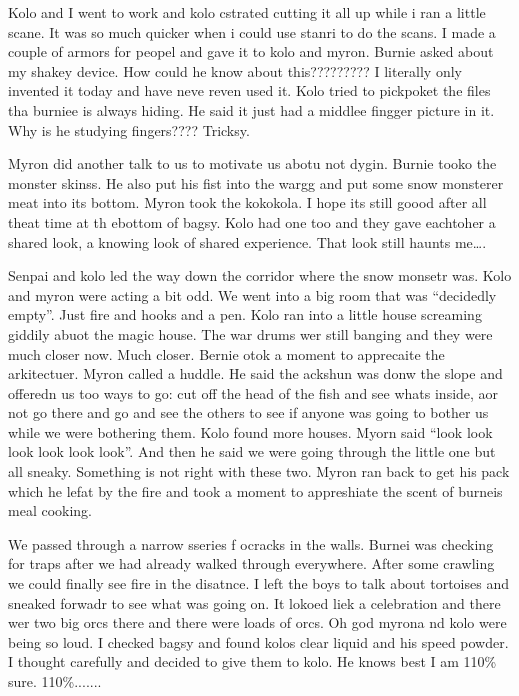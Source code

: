 \begin{multicols}{2}
Kolo and I went to work and kolo cstrated cutting it all up while i ran a little scane. It was so much quicker when i could use stanri to do the scans. I made a couple of armors for peopel and gave it to kolo and myron. Burnie asked about my shakey device. How could he know about this????????? I literally only invented it today and have neve reven used it. Kolo tried to pickpoket the files tha burniee is always hiding. He said it just had a middlee fingger picture in it. Why is he studying fingers???? Tricksy.\medskip

Myron did another talk to us to motivate us abotu not dygin. Burnie tooko the monster skinss. He also put his fist into the wargg and put some snow monsterer meat into its bottom. Myron took the kokokola. I hope its still goood after all theat time at th ebottom of bagsy. Kolo had one too and they gave eachtoher a shared look, a knowing look of shared experience. That look still haunts me….\medskip

Senpai and kolo led the way down the corridor where the snow monsetr was. Kolo and myron were acting a bit odd. We went into a big room that was “decidedly empty”. Just fire and hooks and a pen. Kolo ran into a little house screaming giddily abuot the magic house. The war drums wer still banging and they were much closer now. Much closer. Bernie otok a moment to apprecaite the arkitectuer. Myron called a huddle. He said the ackshun was donw the slope and offeredn us too ways to go: cut off the head of the fish and see whats inside, aor not go there and go and see the others to see if anyone was going to bother us while we were bothering them. Kolo found more houses. Myorn said “look look look look look look”. And then he said we were going through the little one but all sneaky. Something is not right with these two. Myron ran back to get his pack which he lefat by the fire and took a moment to appreshiate the scent of burneis meal cooking.\medskip

We passed through a narrow sseries f ocracks in the walls. Burnei was checking for traps after we had already walked through everywhere. After some crawling we could finally see fire in the disatnce. I left the boys to talk about tortoises and sneaked forwadr to see what was going on. It lokoed liek a celebration and there wer two big orcs there and there were loads of orcs. Oh god myrona nd kolo were being so loud. I checked bagsy and found kolos clear liquid and his speed powder. I thought carefully and decided to give them to kolo. He knows best I am 110\% sure. 110\%.......\medskip


\end{multicols}
